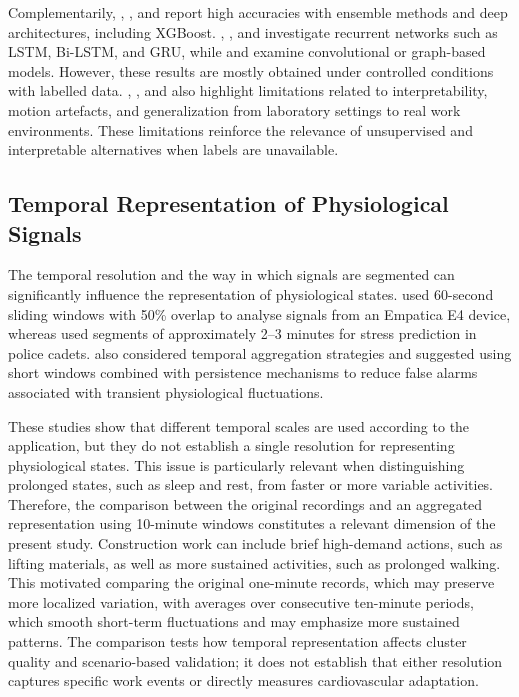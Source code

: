 \documentclass[a4paper,fleqn]{cas-sc}
\newcommand{\newtextblue}[1]{{\color{blue}#1}}
\newcommand{\newtextgreen}[1]{{\color{green!60!black}#1}}
\begin{document}
\newtextgreen{Complementarily, \citet{goutham2025}, \citet{thomas2025}, and \citet{fasoyinu2025} report high accuracies with ensemble methods and deep architectures, including XGBoost. \citet{umer2025}, \citet{karim2025}, and \citet{wang2024} investigate recurrent networks such as LSTM, Bi-LSTM, and GRU, while \citet{anjum2025} and \citet{cheng2025} examine convolutional or graph-based models. However, these results are mostly obtained under controlled conditions with labelled data. \citet{kakhi2025}, \citet{ojha2024}, and \citet{albarran2025} also highlight limitations related to interpretability, motion artefacts, and generalization from laboratory settings to real work environments. These limitations reinforce the relevance of unsupervised and interpretable alternatives when labels are unavailable.}

\subsection{Temporal Representation of Physiological Signals}

The temporal resolution and the way in which signals are segmented can significantly influence the representation of physiological states. \citet{goutham2025} used 60-second sliding windows with 50\% overlap to analyse signals from an Empatica E4 device, whereas \citet{sim2023} used segments of approximately 2--3 minutes for stress prediction in police cadets. \citet{albarran2025} also considered temporal aggregation strategies and suggested using short windows combined with persistence mechanisms to reduce false alarms associated with transient physiological fluctuations.

These studies show that different temporal scales are used according to the application, but they do not establish a single resolution for representing physiological states. This issue is particularly relevant when distinguishing prolonged states, such as sleep and rest, from faster or more variable activities. Therefore, the comparison between the original recordings and an aggregated representation using 10-minute windows constitutes a relevant dimension of the present study. \newtextblue{Construction work can include brief high-demand actions, such as lifting materials, as well as more sustained activities, such as prolonged walking. This motivated comparing the original one-minute records, which may preserve more localized variation, with averages over consecutive ten-minute periods, which smooth short-term fluctuations and may emphasize more sustained patterns. The comparison tests how temporal representation affects cluster quality and scenario-based validation; it does not establish that either resolution captures specific work events or directly measures cardiovascular adaptation.}
\end{document}
